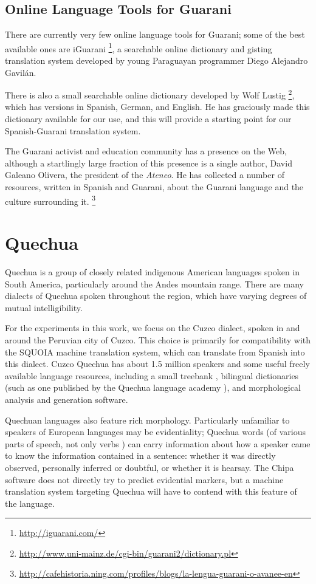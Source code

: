 \subsection{Online Language Tools for Guarani}
There are currently very few online language tools for Guarani; some of the
best available ones are iGuarani \footnote{\url{http://iguarani.com/}}, a
searchable online dictionary and gisting translation system developed by young
Paraguayan programmer Diego Alejandro Gavilán.

There is also a small searchable online dictionary developed by Wolf Lustig
\footnote{\url{http://www.uni-mainz.de/cgi-bin/guarani2/dictionary.pl}},
which has versions in Spanish, German, and English. He has graciously made this
dictionary available for our use, and this will provide a starting point for
our Spanish-Guarani translation system.

The Guarani activist and education community has a presence on the Web,
although a startlingly large fraction of this presence is a single author,
David Galeano Olivera, the president of the \emph{Ateneo}.
He has collected a number of resources, written in Spanish
and Guarani, about the Guarani language and the culture surrounding it.
\footnote{\url{http://cafehistoria.ning.com/profiles/blogs/la-lengua-guarani-o-avanee-en}}

\section{Quechua}
Quechua is a group of closely related indigenous American languages spoken in
South America, particularly around the Andes mountain range.
There are many dialects of Quechua spoken throughout the region, which have
varying degrees of mutual intelligibility.

For the experiments in this work, we focus on the Cuzco dialect, spoken in and
around the Peruvian city of Cuzco. This choice is primarily for compatibility
with the SQUOIA machine translation system, which can translate from Spanish
into this dialect. Cuzco Quechua has about 1.5 million speakers and some useful
freely available language resources, including a small treebank
\cite{rios2009quechua}, bilingual dictionaries (such as one published by the
Quechua language academy \cite{academiamayor}), and morphological analysis and
generation software.

Quechuan languages also feature rich morphology. Particularly unfamiliar to
speakers of European languages may be evidentiality; Quechua words (of various
parts of speech, not only verbs \cite{coronel2002quechua}) can carry
information about how a speaker came to know the information contained in a
sentence: whether it was directly observed, personally inferred or doubtful, or
whether it is hearsay.
The Chipa software does not directly try to predict evidential markers, but a
machine translation system targeting Quechua will have to contend with this
feature of the language.
